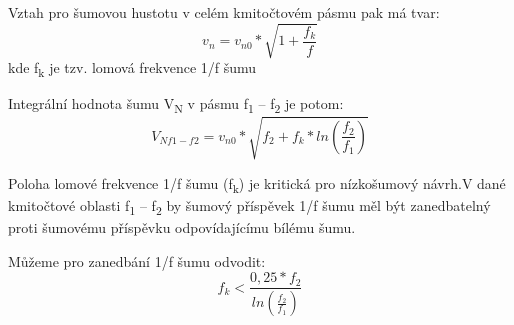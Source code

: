Vztah pro šumovou hustotu v celém kmitočtovém pásmu pak má tvar:
\begin{equation}
v_{n} = v_{n0}*\sqrt{1+\frac{f_{k}}{f}}
\end{equation}
kde f\textsubscript{k} je tzv. lomová frekvence 1/f šumu

Integrální hodnota šumu V\textsubscript{N} v pásmu f\textsubscript{1} – f\textsubscript{2} je potom:
\begin{equation}
V_{N{f1-f2}}=v_{n0}*\sqrt{f_{2}+f_{k}*ln(\frac{f_{2}}{f_{1}})}
\end{equation}

Poloha lomové frekvence 1/f šumu (f\textsubscript{k}) je kritická pro nízkošumový návrh.V dané kmitočtové oblasti f\textsubscript{1} – f\textsubscript{2} by šumový příspěvek 1/f šumu měl být zanedbatelný proti šumovému příspěvku odpovídajícímu bílému šumu.

Můžeme pro zanedbání 1/f šumu odvodit:
\begin{equation}
f_{k} < \frac{0,25*f_{2}}{ln(\frac{f_{2}}{f_{1}})}
\end{equation}



